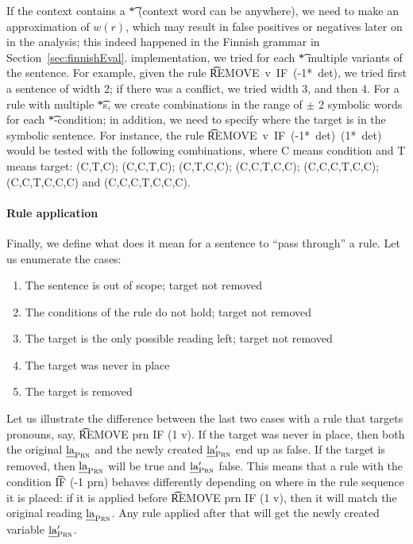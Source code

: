 If the context contains a \t{*} (context word can be anywhere), we
need to make an approximation of $w(r)$, which may result in false
positives or negatives later on in the analysis; this indeed happened
in the Finnish grammar in Section~\ref{sec:finnishEval}. %
implementation, we tried for each \t{*} multiple variants of the
sentence.  For example, given the rule \t{REMOVE~v~IF~(-1*~det)}, we
tried first a sentence of width 2; if there was a conflict, we tried
width 3, and then 4. For a rule with multiple \t{*}s, we create
combinations in the range of $\pm$ 2 symbolic words for
each \t{*}-condition; in addition, we need to specify where the target
is in the symbolic sentence.  For instance, the
rule \t{REMOVE~v~IF~(-1*~det)~(1*~det)} would be tested with the
following combinations, where C means condition and T means target:
(C,T,C); 
(C,C,T,C); 
(C,T,C,C); 
(C,C,T,C,C); 
(C,C,C,T,C,C); 
(C,C,T,C,C,C) and
(C,C,C,T,C,C,C).



\paragraph{Rule application}
Finally, we define what does it mean for a sentence to ``pass through'' a rule. 
Let us enumerate the cases:
\begin{enumerate}
\item The sentence is out of scope; target not removed
\item The conditions of the rule do not hold; target not removed
\item The target is the only possible reading left; target not removed
\item The target was never in place
\item The target is removed
\end{enumerate}
Let us illustrate the difference between the last two cases with a rule that targets pronouns, say, \t{REMOVE prn IF (1 v)}. 
If the target was never in place, then both the original $\text{\em la}_{\text{\sc Prn}}$ and the newly created $\text{\em la}{}'_{\text{\sc Prn}}$ end up as false. 
If the target is removed, then $\text{\em la}_{\text{\sc Prn}}$ will be true and $\text{\em la}{}'_{\text{\sc Prn}}$ false.
This means that a rule with the condition \t{IF (-1 prn)} behaves differently depending on where in the rule sequence it is placed: 
if it is applied before \t{REMOVE prn IF (1 v)}, then it will match the original reading $\text{\em la}_{\text{\sc Prn}}$. Any rule applied after that will get the newly created variable $\text{\em la}{}'_{\text{\sc Prn}}$.

